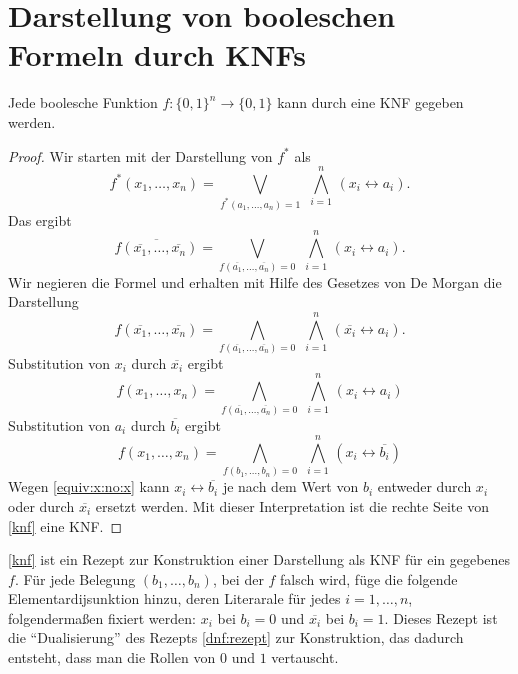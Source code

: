\section{Darstellung  von booleschen Formeln durch KNFs}

\begin{thm}
	Jede boolesche Funktion $f : \{0,1\}^n \to \{0,1\}$ kann durch eine KNF gegeben werden. 
\end{thm} 
\begin{proof}
		Wir starten mit der Darstellung von $f^\ast$ als 
		\[
			f^\ast(x_1,\ldots,x_n) = \bigvee_{f^\ast(a_1,\ldots,a_n)=1} \ \, \bigwedge_{i=1}^n \, (x_i \leftrightarrow a_i).
		\]
		Das ergibt 
		\[
			\overline{ f(\overline{x_1},\ldots,\overline{x_n})} = \bigvee_{f(\overline{a_1},\ldots,\overline{a_n}) = 0} \ \, \bigwedge_{i=1}^n  \, (x_i \leftrightarrow a_i). 
		\]
		Wir negieren die Formel und erhalten mit Hilfe des Gesetzes von De Morgan die Darstellung 
		\[	
				f(\overline{x_1},\ldots,\overline{x_n}) = \bigwedge_{f(\overline{a_1},\ldots,\overline{a_n})=0} \ \, \bigwedge_{i=1}^n  \, (\overline{x_i} \leftrightarrow a_i). 
		\]
		Substitution von $x_i$ durch $\overline{x_i}$ ergibt 
		\[
				f(x_1,\ldots,x_n) = \bigwedge_{f(\overline{a_1},\ldots,\overline{a_n})=0} \ \, \bigwedge_{i=1}^n  \, (x_i \leftrightarrow a_i)
		\]
		Substitution von $a_i$ durch $\overline{b_i}$ ergibt
		\begin{equation} \label{knf} 
			f(x_1,\ldots,x_n) = \bigwedge_{f(b_1,\ldots,b_n)=0} \ \, \bigwedge_{i=1}^n  \, (x_i \leftrightarrow \overline{b_i})
		\end{equation}
		Wegen \eqref{equiv:x:no:x} kann $x_i \leftrightarrow \overline{b_i}$ je nach dem Wert von $b_i$ entweder durch $x_i$ oder durch $\overline{x_i}$ ersetzt werden. Mit dieser Interpretation ist die rechte Seite von \eqref {knf} eine KNF. 
\end{proof} 

\begin{bem}
	\eqref{knf} ist ein Rezept zur Konstruktion einer Darstellung als KNF für ein gegebenes $f$. Für jede Belegung $(b_1,\ldots,b_n)$, bei der $f$ falsch wird, füge die folgende Elementardijsunktion hinzu, deren Literarale für jedes $i=1,\ldots,n$, folgendermaßen fixiert werden: $x_i$ bei $b_i=0$ und $\overline{x_i}$ bei $b_i=1$. Dieses Rezept ist die ``Dualisierung'' des Rezepts \eqref{dnf:rezept} zur Konstruktion, das dadurch entsteht, dass man die Rollen von $0$ und $1$ vertauscht. 
\end{bem} 


